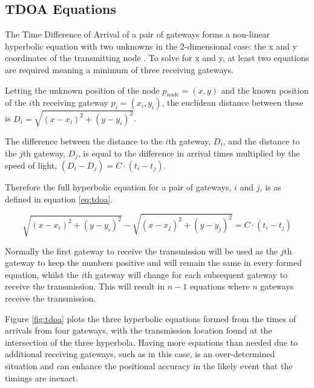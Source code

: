 \documentclass[a4paper]{report}
\begin{document}
    \subsection{TDOA Equations}

      The Time Difference of Arrival of a pair of gateways forms a non-linear hyperbolic equation with two unknowns in the 2-dimensional case: the x and y coordinates of the transmitting node \cite{ElGemayel2013}\cite{Steffes2014}. To solve for x and y, at least two equations are required meaning a minimum of three receiving gateways.

      Letting the unknown position of the node \(p_{node} = (x, y)\) and the known position of the \(i\)th receiving gateway \(p_i = (x_i, y_i)\), the euclidean distance between these is \(D_i = \sqrt{(x - x_i)^2 + (y - y_i)^2}\).

      The difference between the distance to the \(i\)th gateway, \(D_{i}\), and the distance to the \(j\)th gateway, \(D_{j}\), is equal to the difference in arrival times multiplied by the speed of light, \((D_i - D_j) = C\cdot(t_i - t_j)\).

      Therefore the full hyperbolic equation for a pair of gateways, \(i\) and \(j\), is as defined in equation \ref{eq:tdoa}.

      \begin{equation}
        \label{eq:tdoa}
        \sqrt{(x - x_i)^2 + (y - y_i)^2} - \sqrt{(x - x_j)^2 + (y - y_j)^2} = C\cdot(t_i - t_j)
      \end{equation}

      Normally the first gateway to receive the transmission will be used as the \(j\)th gateway to keep the numbers positive and will remain the same in every formed equation, whilst the \(i\)th gateway will change for each subsequent gateway to receive the transmission. This will result in \(n-1\) equations where \(n\) gateways receive the transmission.

      Figure \ref{fig:tdoa} plots the three hyperbolic equations formed from the times of arrivals from four gateways, with the transmission location found at the intersection of the three hyperbola. Having more equations than needed due to additional receiving gateways, such as in this case, is an over-determined situation and can enhance the positional accuracy in the likely event that the timings are inexact.
\end{document}
